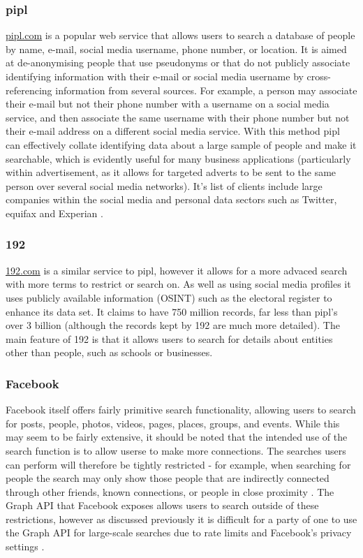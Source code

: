 \documentclass[12pt]{article}
\begin{document}
\subsubsection{pipl}
\url{pipl.com} is a popular web service that allows users to search a database of people by name, e-mail, social media username, phone number, or location. It is aimed at de-anonymising people that use pseudonyms or that do not publicly associate identifying information with their e-mail or social media username by cross-referencing information from several sources. For example, a person may associate their e-mail but not their phone number with a username on a social media service, and then associate the same username with their phone number but not their e-mail address on a different social media service. With this method pipl can effectively collate identifying data about a large sample of people and make it searchable, which is evidently useful for many business applications (particularly within advertisement, as it allows for targeted adverts to be sent to the same person over several social media networks). It's list of clients include large companies within the social media and personal data sectors such as Twitter, equifax and Experian \citep{pipl}.

\subsubsection{192}
\url{192.com} is a similar service to pipl, however it allows for a more advaced search with more terms to restrict or search on. As well as using social media profiles it uses publicly available information (OSINT) such as the electoral register to enhance its data set. It claims to have 750 million records, far less than pipl's over 3 billion (although the records kept by 192 are much more detailed). The main feature of 192 is that it allows users to search for details about entities other than people, such as schools or businesses.

\subsubsection{Facebook}
Facebook itself offers fairly primitive search functionality, allowing users to search for posts, people, photos, videos, pages, places, groups, and events. While this may seem to be fairly extensive, it should be noted that the intended use of the search function is to allow userse to make more connections. The searches users can perform will therefore be tightly restricted - for example, when searching for people the search may only show those people that are indirectly connected through other friends, known connections, or people in close proximity \citep{facebookpeoplesearch}. The Graph API that Facebook exposes allows users to search outside of these restrictions, however as discussed previously it is difficult for a party of one to use the Graph API for large-scale searches due to rate limits and Facebook's privacy settings \citep{facebookgraphapi}. 
\end{document}
